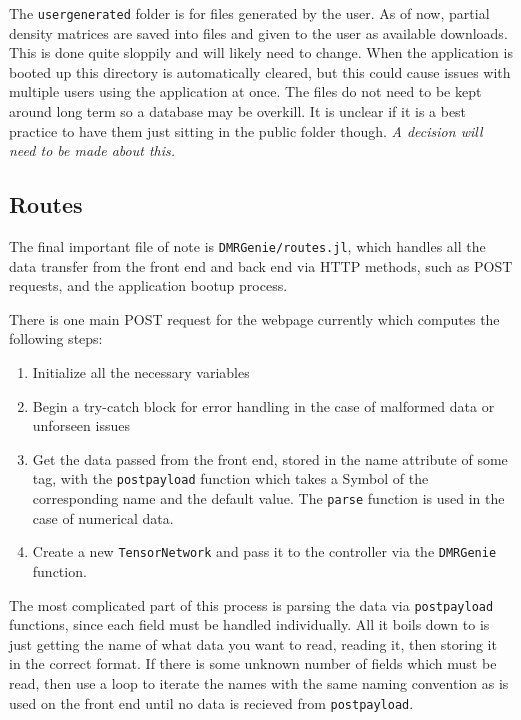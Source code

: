 \documentclass{article}
\begin{document}
\begin{multicols}{2}
The \lstinline|usergenerated| folder is for files generated by the user. As of now, partial density matrices are saved into files and given to the user as available downloads. This is done quite sloppily and will likely need to change. When the application is booted up this directory is automatically cleared, but this could cause issues with multiple users using the application at once. The files do not need to be kept around long term so a database may be overkill. It is unclear if it is a best practice to have them just sitting in the public folder though. \textit{A decision will need to be made about this.}



\subsection{Routes}

The final important file of note is \lstinline|DMRGenie/routes.jl|, which handles all the data transfer from the front end and back end via HTTP methods, such as POST requests, and the application bootup process.

There is one main POST request for the webpage currently which computes the following steps:

\begin{enumerate}
  \item Initialize all the necessary variables
  \item Begin a try-catch block for error handling in the case of malformed data or unforseen issues
  \item Get the data passed from the front end, stored in the name attribute of some tag, with the \lstinline|postpayload| function which takes a Symbol of the corresponding name and the default value. The \lstinline|parse| function is used in the case of numerical data.
  \item Create a new \lstinline|TensorNetwork| and pass it to the controller via the \lstinline|DMRGenie| function.
\end{enumerate}

The most complicated part of this process is parsing the data via \lstinline|postpayload| functions, since each field must be handled individually. All it boils down to is just getting the name of what data you want to read, reading it, then storing it in the correct format. If there is some unknown number of fields which must be read, then use a loop to iterate the names with the same naming convention as is used on the front end until no data is recieved from \lstinline|postpayload|.


\end{multicols}
\end{document}
